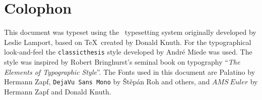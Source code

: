 
\pagestyle{empty}

\hfill

\vfill


\section*{Colophon}

This document was typeset using the \LaTeXe\ typesetting system originally developed by Leslie Lamport, based on \TeX\ created by Donald Knuth.
For the typographical look-and-feel the \texttt{classicthesis} style developed by Andr\'e Miede was used. The style was inspired by Robert Bringhurst's seminal book on typography ``\emph{The Elements of Typographic Style}''.
The Fonts used in this document are Palatino by Hermann Zapf, \texttt{DejaVu Sans Mono} by \v{S}t\v{e}p\'an Roh and others, and $AMS\ Euler$ by Hermann Zapf and Donald Knuth.


\bigskip

\noindent\finalVersionString
